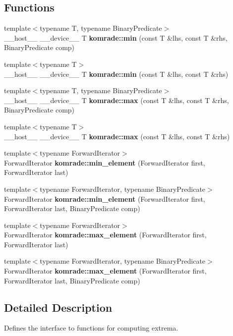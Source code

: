 \subsection*{Functions}
\begin{CompactItemize}
\item 
{\footnotesize template$<$typename T, typename BinaryPredicate$>$ }\\\_\-\_\-host\_\-\_\- \_\-\_\-device\_\-\_\- T {\bf komrade::min} (const T \&lhs, const T \&rhs, BinaryPredicate comp)
\item 
{\footnotesize template$<$typename T$>$ }\\\_\-\_\-host\_\-\_\- \_\-\_\-device\_\-\_\- T {\bf komrade::min} (const T \&lhs, const T \&rhs)
\item 
{\footnotesize template$<$typename T, typename BinaryPredicate$>$ }\\\_\-\_\-host\_\-\_\- \_\-\_\-device\_\-\_\- T {\bf komrade::max} (const T \&lhs, const T \&rhs, BinaryPredicate comp)
\item 
{\footnotesize template$<$typename T$>$ }\\\_\-\_\-host\_\-\_\- \_\-\_\-device\_\-\_\- T {\bf komrade::max} (const T \&lhs, const T \&rhs)
\item 
{\footnotesize template$<$typename ForwardIterator$>$ }\\ForwardIterator {\bf komrade::min\_\-element} (ForwardIterator first, ForwardIterator last)
\item 
{\footnotesize template$<$typename ForwardIterator, typename BinaryPredicate$>$ }\\ForwardIterator {\bf komrade::min\_\-element} (ForwardIterator first, ForwardIterator last, BinaryPredicate comp)
\item 
{\footnotesize template$<$typename ForwardIterator$>$ }\\ForwardIterator {\bf komrade::max\_\-element} (ForwardIterator first, ForwardIterator last)
\item 
{\footnotesize template$<$typename ForwardIterator, typename BinaryPredicate$>$ }\\ForwardIterator {\bf komrade::max\_\-element} (ForwardIterator first, ForwardIterator last, BinaryPredicate comp)
\end{CompactItemize}


\subsection{Detailed Description}
Defines the interface to functions for computing extrema. 

